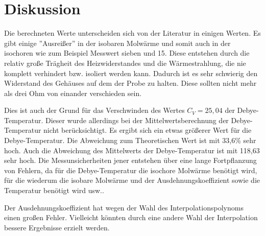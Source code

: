 \section{Diskussion}
Die berechneten Werte unterscheiden sich von der Literatur in einigen Werten. Es gibt einige ''Ausreißer'' in der isobaren Molwärme und somit auch in der isochoren wie zum Beispiel Messwert sieben und 15. Diese entstehen durch die relativ große Trägheit des Heizwiderstandes und die Wärmestrahlung, die nie komplett verhindert bzw. isoliert werden kann. Dadurch ist es sehr schwierig den Widerstand des Gehäuses auf dem der Probe zu halten. Diese sollten nicht mehr als drei Ohm von einander verschieden sein.

\noindent Dies ist auch der Grund für das Verschwinden des Wertes \(C_V=25,04\) der Debye-Temperatur. Dieser wurde allerdings bei der Mittelwertsberechnung der Debye-Temperatur nicht berücksichtigt. Es ergibt sich ein etwas größerer Wert für die Debye-Temperatur. Die Abweichung zum Theoretischen Wert ist mit 33,6\% sehr hoch. Auch die Abweichung des Mittelwerts der Debye-Temperatur ist mit 118,63 sehr hoch. Die Messunsicherheiten jener entstehen über eine lange Fortpflanzung von Fehlern, da für die Debye-Temperatur die isochore Molwärme benötigt wird, für die wiederum die isobare Molwärme und der Ausdehnungskoeffizient sowie die Temperatur benötigt wird usw.. 

\noindent Der Ausdehnungskoeffizient hat wegen der Wahl des Interpolationspolynoms einen großen Fehler. Vielleicht könnten durch eine andere Wahl der Interpolation bessere Ergebnisse erzielt werden.